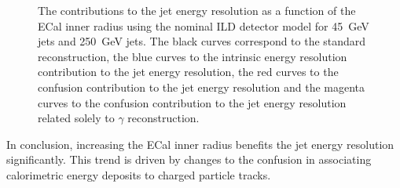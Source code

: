 \begin{figure}[h!]
\caption[The contributions to the jet energy resolution as a function of the ECal inner radius using the nominal ILD detector model for \protect{} 45~GeV jets and \protect{} 250~GeV jets.  The black curves correspond to the standard reconstruction, the blue curves to the intrinsic energy resolution contribution to the jet energy resolution, the red curves to the confusion contribution to the jet energy resolution and the magenta curves to the confusion contribution to the jet energy resolution related solely to $\gamma$ reconstruction.]{The contributions to the jet energy resolution as a function of the ECal inner radius using the nominal ILD detector model for \protect{} 45~GeV jets and \protect{} 250~GeV jets.  The black curves correspond to the standard reconstruction, the blue curves to the intrinsic energy resolution contribution to the jet energy resolution, the red curves to the confusion contribution to the jet energy resolution and the magenta curves to the confusion contribution to the jet energy resolution related solely to $\gamma$ reconstruction.}
\label{fig:ecalinnerrbreak}
\end{figure}

In conclusion, increasing the ECal inner radius benefits the jet energy resolution significantly.  This trend is driven by changes to the confusion in associating calorimetric energy deposits to charged particle tracks.  
